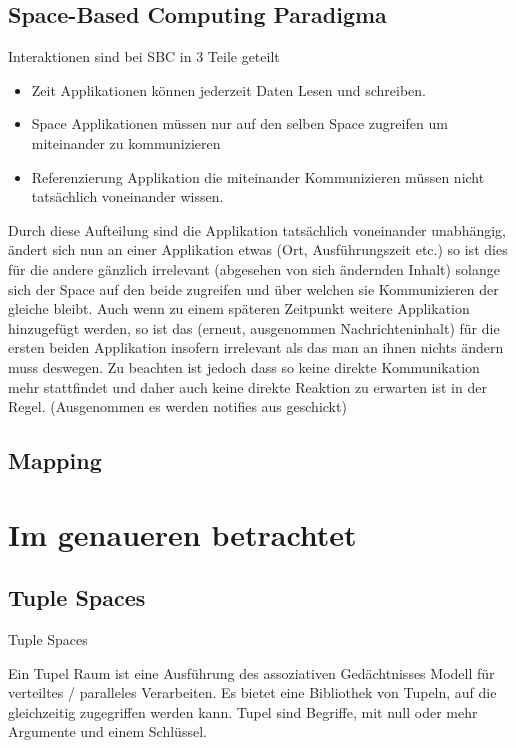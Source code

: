 \documentclass[a4paper,12pt]{scrreprt}
\begin{document}
	\section{Space-Based Computing Paradigma}
		Interaktionen sind bei SBC in 3 Teile geteilt 
		\begin{itemize}
			\item Zeit
				\subitem Applikationen können jederzeit Daten Lesen und schreiben.
			\item Space
				\subitem Applikationen müssen nur auf den selben Space zugreifen um miteinander zu kommunizieren
			\item Referenzierung
				\subitem Applikation die miteinander Kommunizieren müssen nicht tatsächlich voneinander wissen.
		\end{itemize}
		Durch diese Aufteilung sind die Applikation tatsächlich voneinander unabhängig, ändert sich nun an einer Applikation etwas (Ort, Ausführungszeit etc.) so ist dies für die andere gänzlich irrelevant (abgesehen von sich ändernden Inhalt) solange sich der Space auf den beide zugreifen und über welchen sie Kommunizieren der gleiche bleibt. Auch wenn zu einem späteren Zeitpunkt weitere Applikation hinzugefügt werden, so ist das (erneut, ausgenommen Nachrichteninhalt) für die ersten beiden Applikation insofern irrelevant als das man an ihnen nichts ändern muss deswegen. Zu beachten ist jedoch dass so keine direkte Kommunikation mehr stattfindet und daher auch keine direkte Reaktion zu erwarten ist in der Regel. (Ausgenommen es werden notifies aus geschickt)
		
		
		
	\section{Mapping}
		
	
\chapter{Im genaueren betrachtet}
	\section{Tuple Spaces}
		Tuple Spaces
		
		Ein Tupel Raum ist eine Ausführung des assoziativen Gedächtnisses Modell für verteiltes / paralleles Verarbeiten. Es bietet eine Bibliothek von Tupeln, auf  die gleichzeitig zugegriffen werden kann. Tupel sind Begriffe, mit null oder mehr Argumente und einem Schlüssel. %
		
\end{document}
